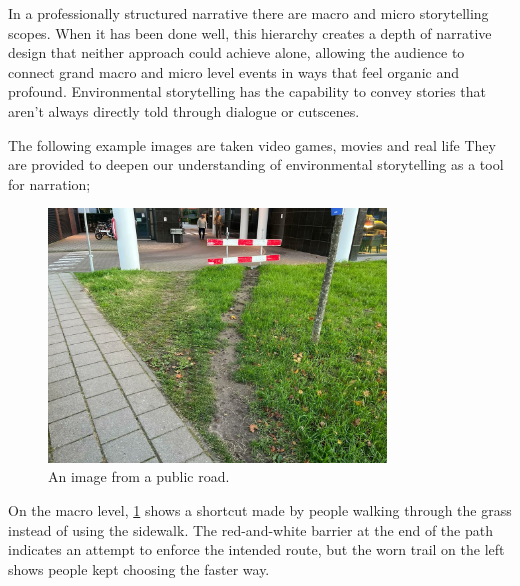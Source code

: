         In a professionally structured narrative there are macro and micro storytelling scopes\cite{Liminal_Space_Between_Embedded_and_Emergent_Narrative}. When it has been done well, this hierarchy creates a depth of narrative design that neither approach could achieve alone, allowing the audience to connect grand macro and micro level events in ways that feel organic and profound\cite{Environmental_Storytelling_Blogpost}. Environmental storytelling has the capability to convey stories that aren’t always directly told through dialogue or cutscenes.\par

        The following example images are taken video games, movies and real life They are provided to deepen our understanding of environmental storytelling as a tool for narration;

        \begin{figure}[H]
        \centering
        \includegraphics[width=0.8\textwidth]{images/environmental_storytelling_02}
        \caption{An image from a public road.}
        \label{fig:ES_01}
        \end{figure}

        On the macro level, \ref{fig:ES_01} shows a shortcut made by people walking through the grass instead of using the sidewalk. The red-and-white barrier at the end of the path indicates an attempt to enforce the intended route, but the worn trail on the left shows people kept choosing the faster way.\par

